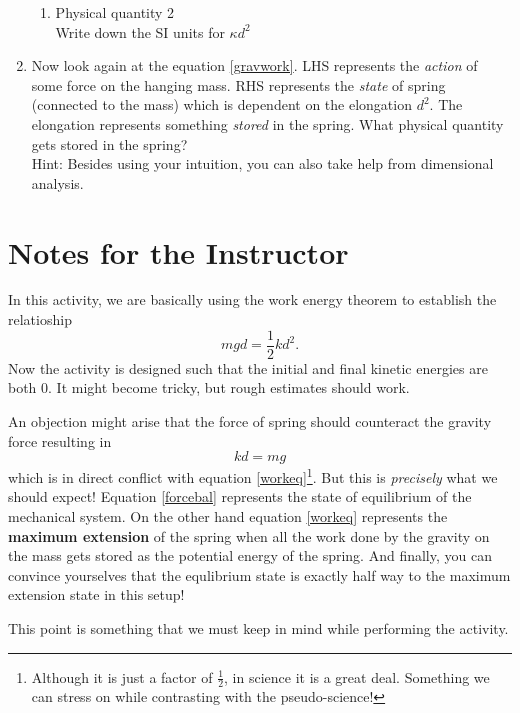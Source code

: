 \documentclass[10pt]{article}
\begin{document}
\begin{enumerate}
\begin{enumerate}
\item Physical quantity 2 \underline{\hspace{5cm}}\\
Write down the SI units for $\kappa d^2$ \underline{\hspace{5cm}}
\end{enumerate}
\item Now look again at the equation \ref{gravwork}.  LHS represents the \emph{action} of some force on the hanging mass.  RHS represents the \emph{state} of spring (connected to the mass) which is dependent on the elongation $d^2$.  The elongation represents something \emph{stored} in the spring.  What physical quantity gets stored in the spring?\\
Hint: Besides using your intuition, you can also take help from dimensional analysis.
\vspace{50px}  
\end{enumerate}
\newpage
\section{Notes for the Instructor}
In this activity, we are basically using the work energy theorem to establish the relatioship 
\begin{equation}
\label{workeq}
  mgd = \frac{1}{2}kd^2.
\end{equation}
Now the activity is designed such that the initial and final kinetic energies are both 0.  It might become tricky, but rough estimates should work. 

An objection might arise that the force of spring should counteract the gravity force resulting in 
\begin{equation}
\label{forcebal}
  kd = mg
\end{equation}
which is in direct conflict with equation \ref{workeq}\footnote{Although it is just a factor of $\frac{1}{2}$, in science it is a great deal.  Something we can stress on while contrasting with the pseudo-science!}.  But this is \emph{precisely} what we should expect!  Equation \ref{forcebal} represents the state of equilibrium of the mechanical system.  On the other hand equation \ref{workeq} represents the \textbf{maximum extension} of the spring when all the work done by the gravity on the mass gets stored as the potential energy of the spring.  And finally, you can convince yourselves that the equlibrium state is exactly half way to the maximum extension state in this setup!

This point is something that we must keep in mind while performing the activity.
\end{document}
